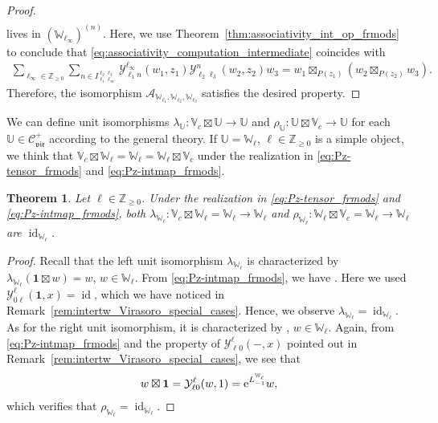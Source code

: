 \documentclass[pdftex]{sigma}
\numberwithin{equation}{section}
\newtheorem{thm}{Theorem}[section]
\newcommand{\ol}[1]{\overline{#1}}
\newcommand{\id}{\operatorname{id}}
\newcommand{\bZ}{\mathbb{Z}}
\newcommand{\cA}{\mathcal{A}}
\newcommand{\cC}{\mathcal{C}}
\newcommand{\catVir}{\cC_{\vir}}
\newcommand{\Chan}[4]{I^{#1 #2}_{#3 #4}}
\newcommand{\voavac}{\mathbf{1}}
\newcommand{\voaint}{\mathcal{Y}}
\newcommand{\vmodvec}{w}
\newcommand{\virvoa}{\mathbb{V}}
\newcommand{\virmod}{\mathbb{W}}
\newcommand{\virmodgen}{\mathbb{U}}
\newcommand{\vir}{\mathfrak{vir}}
\begin{document}
\begin{proof}
\begin{gather*}
\end{gather*}
lives in $(\virmod_{\ell_{\infty}})^{(n)}$.
Here, we use Theorem~\ref{thm:associativity_int_op_frmods} to conclude that \eqref{eq:associativity_computation_intermediate} coincides with
\begin{align*}
 \sum_{\ell_{\infty}\in\bZ_{\geq 0}}\sum_{n\in \Chan{\ell_{2}}{\ell_{3}}{\ell_{1}}{\ell_{\infty}}}\voaint_{\ell_{1} n}^{\ell_{\infty}}(\vmodvec_{1},z_{1})\voaint_{\ell_{2} \ell_{3}}^{n}(\vmodvec_{2},z_{2})\vmodvec_{3}=\vmodvec_{1}\boxtimes_{P(z_{1})}(\vmodvec_{2}\boxtimes_{P(z_{2})}\vmodvec_{3}).
\end{align*}
Therefore, the isomorphism $\cA_{\virmod_{\ell_{1}},\virmod_{\ell_{2}},\virmod_{\ell_{3}}}$ satisfies the desired property.
\end{proof}

We can define unit isomorphisms $\lambda_{\virmodgen}\colon \virvoa_{c}\boxtimes\virmodgen\to\virmodgen$ and $\rho_{\virmodgen}\colon \virmodgen\boxtimes\virvoa_{c}\to \virmodgen$ for each $\virmodgen\in\catVir^{+}$ according to the general theory.
If $\virmodgen=\virmod_{\ell}$, $\ell\in\bZ_{\geq 0}$ is a simple object, we think that $\virvoa_{c}\boxtimes\virmod_{\ell}=\virmod_{\ell}=\virmod_{\ell}\boxtimes\virvoa_{c}$ under the realization in \eqref{eq:Pz-tensor_frmods} and \eqref{eq:Pz-intmap_frmods}.
\begin{thm}
\label{thm:unit_isom_catvir}
Let $\ell\in\bZ_{\geq 0}$. Under the realization in \eqref{eq:Pz-tensor_frmods} and \eqref{eq:Pz-intmap_frmods}, both $\lambda_{\virmod_{\ell}}\colon \virvoa_{c}\boxtimes \virmod_{\ell}=\virmod_{\ell}\to\virmod_{\ell}$ and $\rho_{\virmod_{\ell}}\colon \virmod_{\ell}\boxtimes\virvoa_{c}=\virmod_{\ell}\to\virmod_{\ell}$ are $\id_{\virmod_{\ell}}$.
\end{thm}
\begin{proof}
Recall that the left unit isomorphism $\lambda_{\virmod_{\ell}}$ is characterized by $\lambda_{\virmod_{\ell}}(\voavac\boxtimes \vmodvec)=\vmodvec$, $\vmodvec\in\virmod_{\ell}$.
From \eqref{eq:Pz-intmap_frmods}, we have
\smash{$
 \voavac\boxtimes \vmodvec=\voaint_{0 \ell}^{\ell}(\voavac,1)\vmodvec=\vmodvec$}.
Here we used $\voaint_{0 \ell}^{\ell}(\voavac,x)=\id$, which we have noticed in Remark~\ref{rem:intertw_Virasoro_special_cases}.
Hence, we observe $\lambda_{\virmod_{\ell}}=\id_{\virmod_{\ell}}$.
As for the right unit isomorphism, it is characterized by \smash{$\ol{\rho_{\virmod_{\ell}}}(\vmodvec\boxtimes \voavac)={\rm e}^{L^{\virmod_{\ell}}_{-1}}\vmodvec$}, $\vmodvec\in\virmod_{\ell}$.
Again, from \eqref{eq:Pz-intmap_frmods} and the property of $\voaint_{\ell 0}^{\ell}(-,x)$ pointed out in Remark~\ref{rem:intertw_Virasoro_special_cases}, we see that
\begin{gather*}
 \vmodvec\boxtimes \voavac = \voaint_{\ell 0}^{\ell}(\vmodvec,1)={\rm e}^{L^{\virmod_{\ell}}_{-1}}\vmodvec,
\end{gather*}
which verifies that $\rho_{\virmod_{\ell}}=\id_{\virmod_{\ell}}$.
\end{proof}
\end{document}
